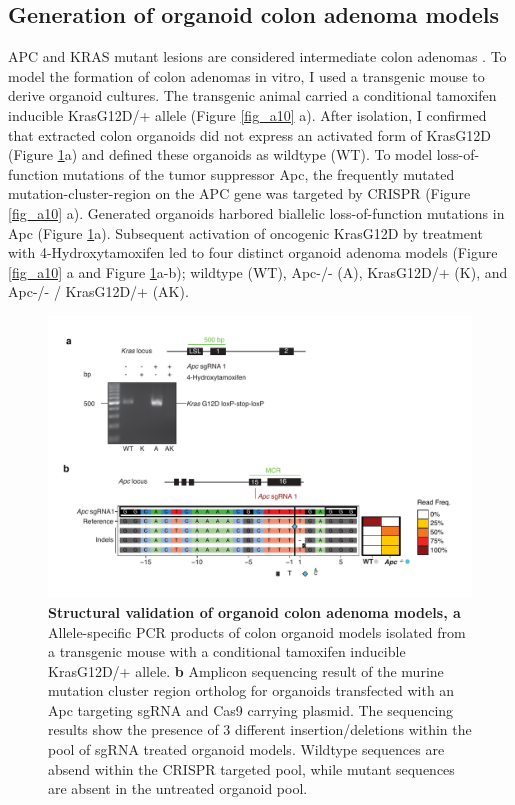 \begin{flushleft}
\section{Generation of organoid colon adenoma models}
APC and KRAS mutant lesions are considered intermediate colon adenomas \cite{Fearon1989-wf}. To model the formation of colon adenomas in vitro, I used a transgenic mouse to derive organoid cultures. The transgenic animal carried a conditional tamoxifen inducible KrasG12D/+ allele \cite{Jackson2001-wv} (Figure \ref{fig_a10} a). After isolation, I confirmed that extracted colon organoids did not express an activated form of KrasG12D (Figure \ref{fig_a11}a) and defined these organoids as wildtype (WT). To model loss-of-function mutations of the tumor suppressor Apc, the frequently mutated mutation-cluster-region on the APC gene was targeted by CRISPR (Figure \ref{fig_a10} a). Generated organoids harbored biallelic loss-of-function mutations in Apc (Figure \ref{fig_a11}a). Subsequent activation of oncogenic KrasG12D by treatment with 4-Hydroxytamoxifen led to four distinct organoid adenoma models (Figure \ref{fig_a10} a and Figure \ref{fig_a11}a-b); wildtype (WT), Apc-/- (A), KrasG12D/+ (K), and Apc-/- / KrasG12D/+ (AK).


\begin{figure}[h]
\centering
\includegraphics[width=\textwidth,
                height=\textheight,
                keepaspectratio]{figures/adenomaprofiling/pdf/fig_1_1.pdf}
\caption{\textbf{Structural validation of organoid colon adenoma models, a} Allele-specific PCR products of colon organoid models isolated from a transgenic mouse with a conditional tamoxifen inducible KrasG12D/+ allele.
\textbf{b} Amplicon sequencing result of the murine mutation cluster region ortholog for organoids transfected with an Apc targeting sgRNA and Cas9 carrying plasmid. The sequencing results show the presence of 3 different insertion/deletions within the pool of sgRNA treated organoid models. Wildtype sequences are absend within the CRISPR targeted pool, while mutant sequences are absent in the untreated organoid pool.}
\label{fig_a11}
\end{figure}
\bigbreak


\end{flushleft}
